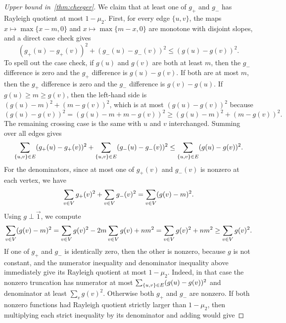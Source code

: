 \begin{proof}[Upper bound in~\cref{thm:cheeger}]
	We claim that at least one of \(g_+\) and \(g_-\) has Rayleigh quotient at most \(1-\mu_2\). First, for every edge \(\{u,v\}\), the maps \(x\mapsto \max\{x-m,0\}\) and \(x\mapsto \max\{m-x,0\}\) are monotone with disjoint slopes, and a direct case check gives
	\begin{equation}
		(g_+(u)-g_+(v))^2+(g_-(u)-g_-(v))^2\leq (g(u)-g(v))^2.
	\end{equation}
	To spell out the case check, if \(g(u)\) and \(g(v)\) are both at least \(m\), then the \(g_-\) difference is zero and the \(g_+\) difference is \(g(u)-g(v)\). If both are at most \(m\), then the \(g_+\) difference is zero and the \(g_-\) difference is \(g(v)-g(u)\). If \(g(u)\geq m\geq g(v)\), then the left-hand side is \((g(u)-m)^2+(m-g(v))^2\), which is at most \((g(u)-g(v))^2\) because
	\begin{equation}
		(g(u)-g(v))^2
		=
		(g(u)-m+m-g(v))^2
		\geq
		(g(u)-m)^2+(m-g(v))^2.
	\end{equation}
	The remaining crossing case is the same with \(u\) and \(v\) interchanged. Summing over all edges gives
	\begin{equation}
		\sum_{\{u,v\}\in E}(g_+(u)-g_+(v))^2+\sum_{\{u,v\}\in E}(g_-(u)-g_-(v))^2
		\leq
		\sum_{\{u,v\}\in E}(g(u)-g(v))^2.
	\end{equation}
	For the denominators, since at most one of \(g_+(v)\) and \(g_-(v)\) is nonzero at each vertex, we have
	\begin{equation}
		\sum_{v\in V}g_+(v)^2+\sum_{v\in V}g_-(v)^2
		=
		\sum_{v\in V}(g(v)-m)^2.
	\end{equation}
	Using \(g\perp\vec{1}\), we compute
	\begin{equation}
		\sum_{v\in V}(g(v)-m)^2
		=
		\sum_{v\in V}g(v)^2-2m\sum_{v\in V}g(v)+nm^2
		=
		\sum_{v\in V}g(v)^2+nm^2
		\geq
		\sum_{v\in V}g(v)^2.
	\end{equation}
	If one of \(g_+\) and \(g_-\) is identically zero, then the other is nonzero, because \(g\) is not constant, and the numerator inequality and denominator inequality above immediately give its Rayleigh quotient at most \(1-\mu_2\). Indeed, in that case the nonzero truncation has numerator at most \(\sum_{\{u,v\}\in E}(g(u)-g(v))^2\) and denominator at least \(\sum_v g(v)^2\). Otherwise both \(g_+\) and \(g_-\) are nonzero. If both nonzero functions had Rayleigh quotient strictly larger than \(1-\mu_2\), then multiplying each strict inequality by its denominator and adding would give

\end{proof}
